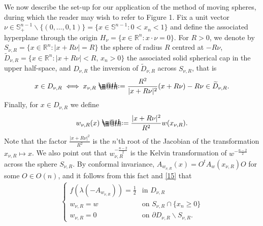 \documentclass[12pt]{article}
\makeatletter
\numberwithin{equation}{section}
\theoremstyle{plain}
\theoremstyle{definition}
\newcommand*{\defeq}{\mathrel{\rlap{%
			\raisebox{0.3ex}{$\m@th\cdot$}}%
		\raisebox{-0.3ex}{$\m@th\cdot$}}%
	=}
\makeatother
\begin{document}
We now describe the set-up for our application of the method of moving spheres, during which the reader may wish to refer to Figure 1. Fix a unit vector $\nu\in \mathbb{S}_+^{n-1}\backslash\{(0,\dots,0,1)\} = \{x\in\mathbb{S}^{n-1}: 0<x_n<1\}$ and define the associated hyperplane through the origin $H_\nu = \{x\in\mathbb{R}^n: x\cdot \nu = 0 \}$. For $R>0$, we denote by $S_{\nu,R} = \{x\in\mathbb{R}^n: |x+R\nu| = R\}$ the sphere of radius $R$ centred at $-R\nu$, $\widetilde{D}_{\nu,R} =\{x\in\mathbb{R}^n: |x+R\nu| < R,\, x_n>0\}$ the associated solid spherical cap in the upper half-space, and $D_{\nu,R}$ the inversion of $\widetilde{D}_{\nu,R}$ across $S_{\nu,R}$, that is
\begin{align*}
x \in D_{\nu,R} \iff x_{\nu,R} \defeq \frac{R^2}{|x+R\nu|^2}(x+R\nu) - R\nu \in \widetilde{D}_{\nu,R}. 
\end{align*}
Finally, for $x\in D_{\nu,R}$ we define
\begin{align*}
w_{\nu,R}(x) \defeq \frac{|x+R\nu|^2}{R^2}w(x_{\nu,R}).
\end{align*}
Note that the factor $ \frac{|x+R\nu|^2}{R^2}$ is the $n$'th root of the Jacobian of the transformation $x_{\nu,R}\mapsto x$. We also point out that $w_{\nu,R}^{-\frac{n-2}{2}}$ is the Kelvin transformation of $w^{-\frac{n-2}{2}}$ across the sphere $S_{\nu,R}$. By conformal invariance, $A_{w_{\nu,R}}(x) = O^t A_w(x_{\nu,R})O$ for some $O\in O(n)$, and it follows from this fact and \eqref{15} that
\begin{align*}
\begin{cases}
f(\lambda(-A_{w_{\nu,R}})) = \frac{1}{2} & \text{in }D_{\nu,R} \\
w_{\nu,R} = w & \text{on }S_{\nu,R} \cap \{x_n \geq 0\} \\
w_{\nu,R} = 0 & \text{on } \partial D_{\nu,R} \backslash S_{\nu,R}. 
\end{cases}
\end{align*}
\end{document}

